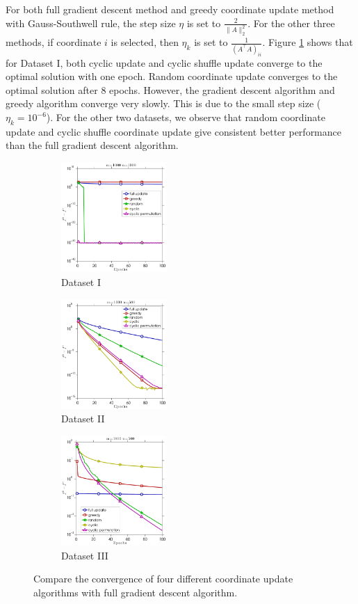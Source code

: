 {For both full gradient descent method and greedy coordinate update method with Gauss-Southwell rule, the step size $\eta$ is set to $\frac{2}{\|A\|_2^2}$. For the other three methods, if coordinate $i$ is selected, then $\eta_k$ is set to $\frac{1}{(A^{\top}A)_{ii}}$. Figure \ref{fig:ls_a} shows that for Dataset I, both cyclic update and cyclic shuffle update converge to the optimal solution with one epoch. Random coordinate update converges to the optimal solution after $8$ epochs. However, the gradient descent algorithm and greedy algorithm converge very slowly. This is due to the small step size ($\eta_k = 10^{-6}$). For the other two datasets, we observe that random coordinate update and cyclic shuffle coordinate update give consistent better performance than the full gradient descent algorithm. 
\begin{figure}[!htbp] \centering
    \begin{subfigure}[b]{0.3\linewidth}
        \includegraphics[width=40mm]{./figs/diag_cropped.pdf}
        \caption{Dataset I}
        \label{fig:ls_a}
    \end{subfigure} %
    \quad
    \begin{subfigure}[b]{0.3\linewidth}
        \includegraphics[width=40mm]{./figs/randn_cropped.pdf}
        \caption{Dataset II}
        \label{fig:ls_b}
    \end{subfigure} %
    \quad
    \begin{subfigure}[b]{0.3\linewidth}
        \includegraphics[width=40mm]{./figs/rand_cropped.pdf}
        \caption{Dataset III}
        \label{fig:ls_c}
    \end{subfigure} %
    \caption{Compare the convergence of four different coordinate update algorithms with full gradient descent algorithm.}
    \label{fig:3s_results}
\end{figure}
}


